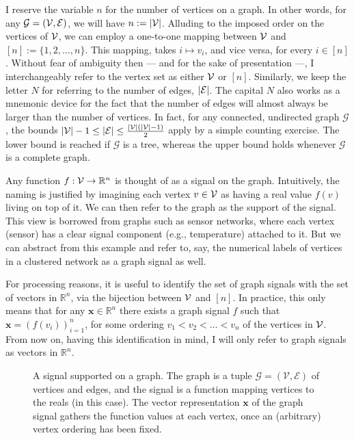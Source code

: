 I reserve the variable $n$ for the number of vertices on a graph. In other words, for any $\mathcal{G} = (\mathcal{V}, \mathcal{E})$, we will have $n := |\mathcal{V}|$. Alluding to the imposed order on the vertices of $\mathcal{V}$, we can employ a one-to-one mapping between $\mathcal{V}$ and $[n] := \{1, 2, \dots, n\}$. This mapping, takes $i \mapsto v_i$, and vice versa, for every $i \in [n]$. Without fear of ambiguity then --- and for the sake of presentation ---, I interchangeably refer to the vertex set as either $\mathcal{V}$ or $[n]$. Similarly, we keep the letter $N$ for referring to the number of edges, $|\mathcal{E}|$. The capital $N$ also works as a mnemonic device for the fact that the number of edges will almost always be larger than the number of vertices. In fact, for any connected, undirected graph $\mathcal{G}$, the bounds $|\mathcal{V}| - 1 \leq |\mathcal{E}| \leq \frac{|\mathcal{V}|(|\mathcal{V}| - 1)}{2}$ apply by a simple counting exercise. The lower bound is reached if $\mathcal{G}$ is a tree, whereas the upper bound holds whenever $\mathcal{G}$ is a complete graph.

Any function $f : \mathcal{V} \to \mathbb{R}^{n}$ is thought of as a signal on the graph. Intuitively, the naming is justified by imagining each vertex $v \in \mathcal{V}$ as having a real value $f(v)$ living on top of it. We can then refer to the graph as the support of the signal. This view is borrowed from graphs such as sensor networks, where each vertex (sensor) has a clear signal component (e.g., temperature) attached to it. But we can abstract from this example and refer to, say, the numerical labels of vertices in a clustered network as a graph signal as well.

For processing reasons, it is useful to identify the set of graph signals with the set of vectors in $\mathbb{R}^{n}$, via the bijection between $\mathcal{V}$ and $[n]$. In practice, this only means that for any $\mathbf{x} \in \mathbb{R}^{n}$ there exists a graph signal $f$ such that $\mathbf{x} = \left( f(v_i) \right)_{i = 1}^n$, for some ordering $v_1 < v_2 < \dots < v_n$ of the vertices in $\mathcal{V}$. From now on, having this identification in mind, I will only refer to graph signals as vectors in $\mathbb{R}^{n}$.

\begin{figure}[H]
    \centering
    
    \caption[A signal supported on a graph]{A signal supported on a graph. The graph is a tuple $\mathcal{G} = (\mathcal{V}, \mathcal{E})$ of vertices and edges, and the signal is a function mapping vertices to the reals (in this case). The vector representation $\mathbf{x}$ of the graph signal gathers the function values at each vertex, once an (arbitrary) vertex ordering has been fixed.}
    \label{fig:graph-signal-example}
\end{figure}


